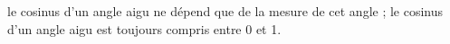 
le cosinus d'un angle aigu ne dépend que de la mesure de cet angle ;
le cosinus d'un angle aigu est toujours compris entre 0 et 1.